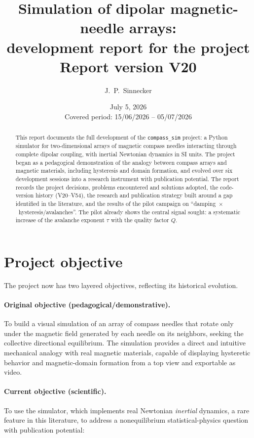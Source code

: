 \documentclass[11pt,a4paper]{article}
\title{\textbf{Simulation of dipolar magnetic-needle arrays:\\
development report for the \code{compass\_sim} project}\\[1ex]
\large Report version V20}
\author{J.~P.~Sinnecker}
\date{July 5, 2026\\[0.5ex]
\small Covered period: 15/06/2026 -- 05/07/2026}
\newcommand{\code}[1]{\texttt{#1}}
\begin{document}
\maketitle

\begin{abstract}
\noindent
This report documents the full development of the \code{compass\_sim} project: a Python simulator for two-dimensional arrays of magnetic compass needles interacting through complete dipolar coupling, with inertial Newtonian dynamics in SI units. The project began as a pedagogical demonstration of the analogy between compass arrays and magnetic materials, including hysteresis and domain formation, and evolved over six development sessions into a research instrument with publication potential. The report records the project decisions, problems encountered and solutions adopted, the code-version history (V20--V54), the research and publication strategy built around a gap identified in the literature, and the results of the pilot campaign on ``damping~$\times$~hysteresis/avalanches''. The pilot already shows the central signal sought: a systematic increase of the avalanche exponent $\tau$ with the quality factor $Q$.
\end{abstract}

\tableofcontents
\newpage

\section{Project objective}

The project now has two layered objectives, reflecting its historical evolution.

\paragraph{Original objective (pedagogical/demonstrative).}
To build a visual simulation of an array of compass needles that rotate only under the magnetic field generated by each needle on its neighbors, seeking the collective directional equilibrium. The simulation provides a direct and intuitive mechanical analogy with real magnetic materials, capable of displaying hysteretic behavior and magnetic-domain formation from a top view and exportable as video.

\paragraph{Current objective (scientific).}
To use the simulator, which implements real Newtonian \emph{inertial} dynamics, a rare feature in this literature, to address a nonequilibrium statistical-physics question with publication potential:
\end{document}
